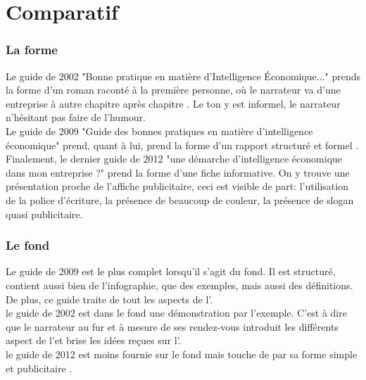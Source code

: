 \part{Comparatif}

	\section{La forme} 
	Le guide de 2002 "Bonne pratique en matière d'Intelligence Économique..." prends la forme d'un roman raconté à la première personne, où le narrateur va d'une entreprise à autre chapitre après chapitre . Le ton y est informel, le narrateur n'hésitant pas faire de l'humour. 
	\\Le guide de 2009 "Guide des bonnes pratiques en matière d'intelligence économique" prend, quant à lui, prend la forme d'un rapport structuré et formel .
	\\Finalement, le dernier guide de 2012 "une démarche d'intelligence économique dans mon entreprise ?" prend la forme d'une fiche informative. On y trouve une présentation proche de l'affiche publicitaire, ceci est visible de part: l'utilisation de la police d'écriture, la présence de beaucoup de couleur, la présence de slogan quasi publicitaire.  	
	
	\section{Le fond}
	Le guide de 2009 est le plus complet lorsqu'il s'agit du fond. Il est structuré, contient aussi bien de l'infographie, que des exemples, mais aussi des définitions. De plus, ce guide traite de tout les aspects de l'\ie .
	\\le guide de 2002 est dans le fond une démonstration par l'exemple. C'est à dire que le narrateur au fur et à mesure de ses rendez-vous introduit les différents aspect de l'\ie et brise les idées reçues sur l'\ie.
	\\le guide de 2012 est moins fournie sur le fond mais touche de par sa forme simple et publicitaire .